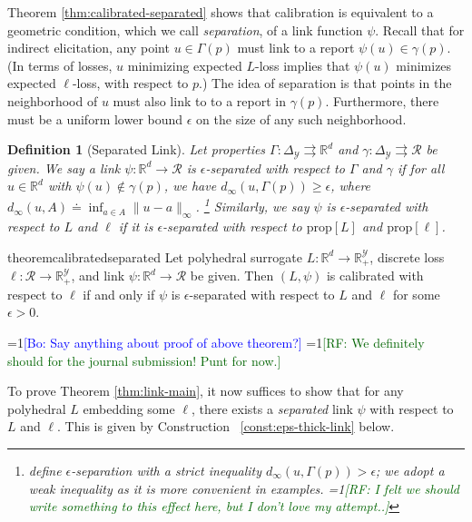 \documentclass[11pt]{article}
\newcommand{\restatehack}[1]{}   %
\newcommand{\Comments}{1}
\newcommand{\mynote}[2]{\ifnum\Comments=1\textcolor{#1}{#2}\fi}
\newcommand{\raf}[1]{\mynote{darkgreen}{[RF: #1]}}
\newcommand{\bo}[1]{\mynote{blue}{[Bo: #1]}}
\newcommand{\reals}{\mathbb{R}}
\newcommand{\prop}[1]{\mathrm{prop}[#1]}
\newcommand{\simplex}{\Delta_\Y}
\newcommand{\R}{\mathcal{R}}
\newcommand{\Y}{\mathcal{Y}}
\newcommand{\toto}{\rightrightarrows}
\newtheorem{theorem}{Theorem}
\newtheorem{definition}{Definition}
\begin{document}
Theorem \ref{thm:calibrated-separated} shows that calibration is equivalent to a geometric condition, which we call \emph{separation}, of a link function $\psi$.
Recall that for indirect elicitation, any point $u \in \Gamma(p)$ must link to a report $\psi(u) \in \gamma(p)$.
(In terms of losses, $u$ minimizing expected $L$-loss implies that $\psi(u)$ minimizes expected $\ell$-loss, with respect to $p$.)
The idea of separation is that points in the neighborhood of $u$ must also link to to a report in $\gamma(p)$.
Furthermore, there must be a uniform lower bound $\epsilon$ on the size of any such neighborhood.

\begin{definition}[Separated Link]\label{def:sep-link}
  Let properties $\Gamma:\simplex\toto\reals^d$ and $\gamma:\simplex\toto\R$ be given.
  We say a link $\psi:\reals^d\to\R$
  is \emph{$\epsilon$-separated with respect to $\Gamma$ and $\gamma$} if for all $u\in\reals^d$ with $\psi(u)\notin\gamma(p)$, we have $d_\infty(u,\Gamma(p)) \geq \epsilon$, where $d_\infty(u,A) \doteq \inf_{a\in A} \|u-a\|_\infty$.%
  \footnote{\citet{frongillo2021surrogate} define $\epsilon$-separation with a strict inequality $d_\infty(u,\Gamma(p)) > \epsilon$; we adopt a weak inequality as it is more convenient in examples. \raf{I felt we should write something to this effect here, but I don't love my attempt..}}
  Similarly, we say $\psi$ is $\epsilon$-separated with respect to $L$ and $\ell$ if it is $\epsilon$-separated with respect to $\prop{L}$ and $\prop{\ell}$.
\end{definition}

\begin{restatable}{theorem}{calibratedseparated} \label{thm:calibrated-separated}
  Let polyhedral surrogate $L:\reals^d \to \reals^\Y_+$, discrete loss $\ell:\R\to\reals^\Y_+$, and link $\psi:\reals^d\to\R$ be given.
  Then $(L,\psi)$ is calibrated with respect to $\ell$ if and only if
  $\psi$ is $\epsilon$-separated with respect to $L$ and $\ell$ for some
  $\epsilon>0$.
\end{restatable}
\bo{Say anything about proof of above theorem?}
\raf{We definitely should for the journal submission!  Punt for now.}

To prove Theorem \ref{thm:link-main}, it now suffices to show that for any polyhedral $L$ embedding some $\ell$, there exists a \emph{separated} link $\psi$ with respect to $L$ and $\ell$.
This is given by Construction ~\ref{const:eps-thick-link} below.

\restatehack{
  \begin{theorem}
    \label{thm:calibrated-separated}
    \label{thm:thickened-separated}
  \end{theorem}}
\end{document}

